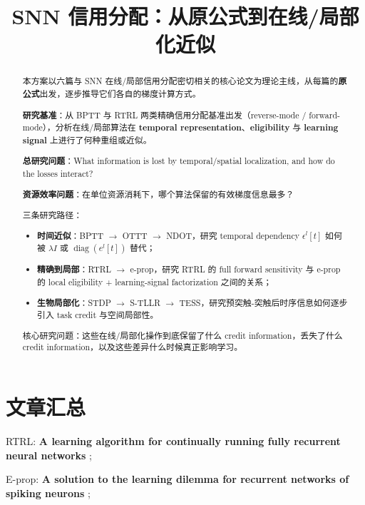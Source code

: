 \documentclass[journal,12pt,onecolumn]{IEEEtran}
\begin{document}
\title{SNN 信用分配：从原公式到在线/局部化近似}

\author{}
\date{}

\maketitle

\begin{abstract}
本方案以六篇与 SNN 在线/局部信用分配密切相关的核心论文为理论主线，从每篇的\textbf{原公式}出发，逐步推导它们各自的梯度计算方式。

\textbf{研究基准}：从 BPTT 与 RTRL 两类精确信用分配基准出发（reverse-mode / forward-mode），分析在线/局部算法在 \textbf{temporal representation}、\textbf{eligibility} 与 \textbf{learning signal} 上进行了何种重组或近似。

\textbf{总研究问题}：What information is lost by temporal/spatial localization, and how do the losses interact?

\textbf{资源效率问题}：在单位资源消耗下，哪个算法保留的有效梯度信息最多？

三条研究路径：
\begin{itemize}[leftmargin=1.5em,itemsep=0pt]
\item \textbf{时间近似}：BPTT $\to$ OTTT $\to$ NDOT，研究 temporal dependency $\epsilon^l[t]$ 如何被 $\lambda I$ 或 $\operatorname{diag}(e^l[t])$ 替代；
\item \textbf{精确到局部}：RTRL $\to$ e-prop，研究 RTRL 的 full forward sensitivity 与 e-prop 的 local eligibility + learning-signal factorization 之间的关系；
\item \textbf{生物局部化}：STDP $\to$ S-TLLR $\to$ TESS，研究预突触-突触后时序信息如何逐步引入 task credit 与空间局部性。
\end{itemize}

核心研究问题：这些在线/局部化操作到底保留了什么 credit information，丢失了什么 credit information，以及这些差异什么时候真正影响学习。
\end{abstract}

\section*{文章汇总}

RTRL: \textbf{A learning algorithm for continually running fully recurrent neural networks} \cite{williams1989learning};

E-prop: \textbf{A solution to the learning dilemma for recurrent networks of spiking neurons} \cite{bellec_solution_2020};
\end{document}
